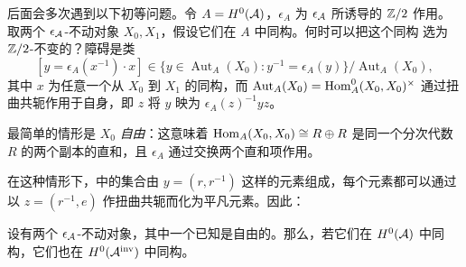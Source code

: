 后面会多次遇到以下初等问题。令 $A=H^0(\mathcal A)$，$\epsilon_A$ 为 $\epsilon_{\mathcal A}$ 所诱导的 $\mathbb Z/2$ 作用。取两个 $\epsilon_{\mathcal A}$-不动对象 $X_0,X_1$，假设它们在 $A$ 中同构。何时可以把这个同构
选为 $\mathbb Z/2$-不变的？障碍是类
\begin{equation}\label{eq:6.1}
[y=\epsilon_A(x^{-1})\cdot x]\in\{y\in\operatorname{Aut}_A(X_0):y^{-1}=\epsilon_A(y)\}/\operatorname{Aut}_A(X_0),
\end{equation}
其中 $x$ 为任意一个从 $X_0$ 到 $X_1$ 的同构，而 $\operatorname{Aut}_A(X_0)=\operatorname{Hom}_A^0(X_0,X_0)^{\times}$ 通过扭曲共轭作用于自身，即 $z$ 将 $y$ 映为 $\epsilon_A(z)^{-1}yz$。
\begin{definition*}
最简单的情形是 $X_0$ \emph{自由}：这意味着 $\operatorname{Hom}_A(X_0,X_0)\cong R\oplus R$ 是同一个分次代数 $R$ 的两个副本的直和，且 $\epsilon_A$ 通过交换两个直和项作用。
\end{definition*}
在这种情形下，中的集合由 $y=(r,r^{-1})$ 这样的元素组成，每个元素都可以通过以 $z=(r^{-1},e)$ 作扭曲共轭而化为平凡元素。因此：
\begin{lemma}\label{st:6.1}
设有两个 $\epsilon_{\mathcal A}$-不动对象，其中一个已知是自由的。那么，若它们在 $H^0(\mathcal A)$ 中同构，它们也在 $H^0(\mathcal A^{\mathrm{inv}})$ 中同构。
\end{lemma}

